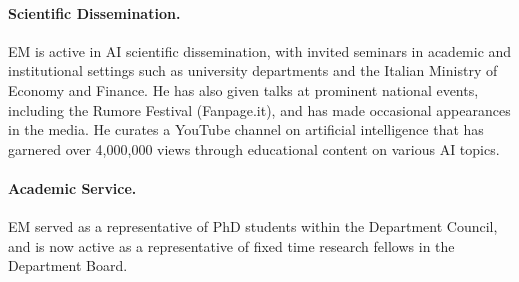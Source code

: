 \paragraph{Scientific Dissemination.} EM is active in AI scientific dissemination, with invited seminars in academic and institutional settings such as university departments and the Italian Ministry of Economy and Finance. He has also given talks at prominent national events, including the Rumore Festival (Fanpage.it), and has made occasional appearances in the media. He curates a YouTube channel on artificial intelligence that has garnered over 4,000,000 views through educational content on various AI topics.

\paragraph{Academic Service.} EM served as a representative of PhD students within the Department Council, and is now active as a representative of fixed time research fellows in the Department Board.


\vspace{30pt}